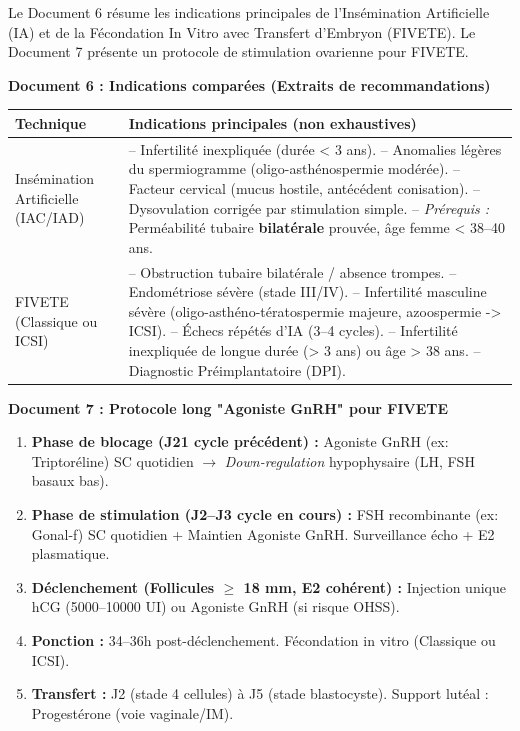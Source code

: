 \documentclass[11pt]{article}
\begin{document}
\begin{exercice}
Le Document 6 résume les indications principales de l'Insémination Artificielle (IA) et de la Fécondation In Vitro avec Transfert d'Embryon (FIVETE). Le Document 7 présente un protocole de stimulation ovarienne pour FIVETE.

\begin{center}
\textbf{Document 6 : Indications comparées (Extraits de recommandations)}
\begin{tabular}{|p{3.5cm}|p{6cm}|}
\hline
\textbf{Technique} & \textbf{Indications principales (non exhaustives)} \\
\hline
Insémination Artificielle (IAC/IAD) & -- Infertilité inexpliquée (durée < 3 ans).\newline
-- Anomalies légères du spermiogramme (oligo-asthénospermie modérée).\newline
-- Facteur cervical (mucus hostile, antécédent conisation).\newline
-- Dysovulation corrigée par stimulation simple.\newline
-- \textit{Prérequis :} Perméabilité tubaire \textbf{bilatérale} prouvée, âge femme < 38--40 ans. \\
\hline
FIVETE (Classique ou ICSI) & -- Obstruction tubaire bilatérale / absence trompes.\newline
-- Endométriose sévère (stade III/IV).\newline
-- Infertilité masculine sévère (oligo-asthéno-tératospermie majeure, azoospermie -> ICSI).\newline
-- Échecs répétés d'IA (3--4 cycles).\newline
-- Infertilité inexpliquée de longue durée (> 3 ans) ou âge > 38 ans.\newline
-- Diagnostic Préimplantatoire (DPI). \\
\hline
\end{tabular}
\end{center}

\begin{center}
\textbf{Document 7 : Protocole long "Agoniste GnRH" pour FIVETE}
\begin{enumerate}
\item \textbf{Phase de blocage (J21 cycle précédent) :} Agoniste GnRH (ex: Triptoréline) SC quotidien $\rightarrow$ \textit{Down-regulation} hypophysaire (LH, FSH basaux bas).
\item \textbf{Phase de stimulation (J2--J3 cycle en cours) :} FSH recombinante (ex: Gonal-f) SC quotidien + Maintien Agoniste GnRH. Surveillance écho + E2 plasmatique.
\item \textbf{Déclenchement (Follicules $\ge$ 18 mm, E2 cohérent) :} Injection unique hCG (5000--10000 UI) ou Agoniste GnRH (si risque OHSS).
\item \textbf{Ponction :} 34--36h post-déclenchement. Fécondation in vitro (Classique ou ICSI).
\item \textbf{Transfert :} J2 (stade 4 cellules) à J5 (stade blastocyste). Support lutéal : Progestérone (voie vaginale/IM).
\end{enumerate}
\end{center}


\end{exercice}
\end{document}
